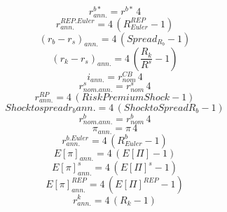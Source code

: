 \begin{dmath}
{r^{b*}_{ann.}}={r^{b*}}\, 4
\end{dmath}
\begin{dmath}
{ r^{REP.Euler}_{ann.} }=4\, \left({ R^{REP}_{Euler} }-1\right)
\end{dmath}
\begin{dmath}
{ (r_b - r_s)_{ann.} }=4\, \left({Spread_R_b}-1\right)
\end{dmath}
\begin{dmath}
{ (r_k - r_s)_{ann.} }=4\, \left(\frac{{ R_k }}{{R^s}}-1\right)
\end{dmath}
\begin{dmath}
{ i_{ann.}}={ r^{CB}_{nom}}\, 4
\end{dmath}
\begin{dmath}
{ r^s_{nom.ann.}}={ r^s_{nom}}\, 4
\end{dmath}
\begin{dmath}
{ r^{RP}_{ann.}}=4\, \left({ Risk Premium Shock }-1\right)
\end{dmath}
\begin{dmath}
{Shock to spread r_b ann.}=4\, \left({Shock to Spread R_b}-1\right)
\end{dmath}
\begin{dmath}
{ r^b_{nom.ann.}}={ r^b_{nom}}\, 4
\end{dmath}
\begin{dmath}
{ \pi_{ann.} }={ \pi }\, 4
\end{dmath}
\begin{dmath}
{ r^{b.Euler}_{ann.} }=4\, \left({ R^b_{Euler} }-1\right)
\end{dmath}
\begin{dmath}
{ E[\pi]_{ann.} }=4\, \left({ E[\Pi] }-1\right)
\end{dmath}
\begin{dmath}
{ E[\pi]_{ann.}^{s} }=4\, \left({ E[\Pi]^{s} }-1\right)
\end{dmath}
\begin{dmath}
{ E[\pi]_{ann.}^{REP} }=4\, \left({ E[\Pi]^{REP} }-1\right)
\end{dmath}
\begin{dmath}
{ r^k_{ann.} }=4\, \left({ R_k }-1\right)
\end{dmath}

